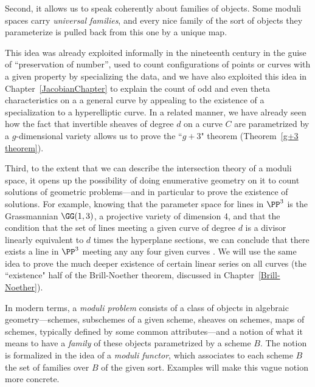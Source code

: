 Second, it allows us to speak coherently about
families of objects. Some moduli spaces carry \emph{universal families}, and every nice family of the sort of objects
they parameterize is pulled back from this one by a unique map.  

This idea was already exploited informally in the nineteenth century in the guise of ``preservation of number'', used to count configurations of points or curves with a given property by specializing the 
data, and we have also exploited this idea in
Chapter~\ref{JacobianChapter} to explain the count of odd and even theta characteristics on a a general curve by appealing to the existence of a specialization to a hyperelliptic curve. In a related manner, we have already seen how the fact that invertible sheaves of degree $d$ on a curve $C$ are parametrized by a $g$-dimensional variety allows us to prove the ``$g+3$" theorem (Theorem~\ref{g+3 theorem}).

Third, to the extent that we can describe the intersection theory of a moduli space, it opens up the possibility of doing enumerative geometry on it to count solutions of geometric problems---and in particular to prove the existence of solutions. For example, knowing that the parameter space for lines in $\PP^3$ is the Grassmannian $\GG(1,3)$, a projective variety of dimension 4, and that the condition that the set of lines meeting a given curve of degree $d$
is a divisor linearly equivalent to  $d$ times the hyperplane sections, we can conclude  that there exists a line in $\PP^3$ meeting any any four given curves \cite[Section 3.4.1]{3264}. We will use the same idea to prove the much deeper existence of certain linear series on all curves (the ``existence" half of the Brill-Noether theorem, discussed in Chapter~\ref{Brill-Noether}). 


In modern terms, a \emph{moduli problem} consists of a class of objects in algebraic geometry---schemes, subschemes of a given scheme, sheaves on schemes, maps of schemes, typically defined by some common attributes---and a notion of what it means to have a \emph{family} of these objects parametrized by a scheme $B$. The notion is formalized in the idea of a \emph{moduli functor}, 
which associates to each scheme $B$ the set of families over $B$ of the given sort. Examples will make this vague notion more concrete.

